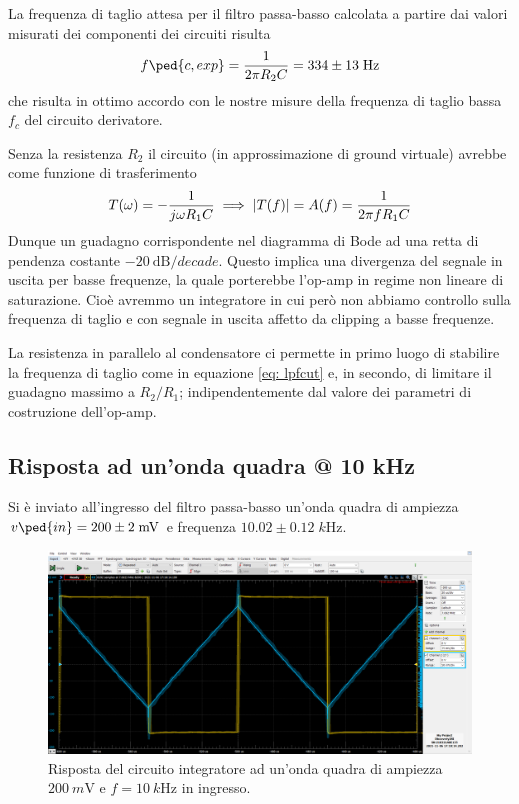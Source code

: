 \documentclass[10pt,a4paper]{article}
\begin{document}
La frequenza di taglio attesa per il filtro passa-basso calcolata a partire
dai valori misurati dei componenti dei circuiti risulta
\begin{equation}\label{eq: lpfcut}
f\ped{c, exp} = \frac{1}{2\pi R_2 C} = 334 \pm 13 \; \si{\Hz}
\end{equation}
che risulta in ottimo accordo con le nostre misure della frequenza di taglio
bassa $f_c$ del circuito derivatore.

Senza la resistenza $R_2$ il circuito (in approssimazione di ground virtuale)
avrebbe come funzione di trasferimento
\[
T(\omega) = - \frac{1}{j \omega R_1 C} \implies
\left| T(f) \right| = A(f) = \frac{1}{2\pi f R_1 C}
\]
Dunque un guadagno corrispondente nel diagramma di Bode ad una retta di
pendenza costante $\SI{-20}{\deci\bel/decade}$.
Questo implica una divergenza del segnale in uscita per basse frequenze, la
quale porterebbe l'op-amp in regime non lineare di saturazione.
Cioè avremmo un integratore in cui però non abbiamo controllo sulla
frequenza di taglio e con segnale in uscita affetto da clipping a basse
frequenze.

La resistenza in parallelo al condensatore ci permette in primo luogo di
stabilire la frequenza di taglio come in equazione \eqref{eq: lpfcut} e,
in secondo, di limitare il guadagno massimo a $R_2/R_1$;
indipendentemente dal valore dei parametri di costruzione dell'op-amp.

\subsection{Risposta ad un'onda quadra @ 10 kHz}
Si è inviato all'ingresso del filtro passa-basso un'onda quadra di
ampiezza $v\ped{in} = 200 \pm 2 \; \si{m\V}$ e frequenza
$10.02 \pm 0.12 \; \si{k\Hz}$.

\begin{figure}[htbp]
\centering
\includegraphics[scale=0.42]{integratore}
\caption{Risposta del circuito integratore ad un'onda quadra di ampiezza
$\SI{200}{m\V}$ e $f = \SI{10}{k\Hz}$ in ingresso. \label{fig: intsqw}}
\end{figure}
\end{document}

